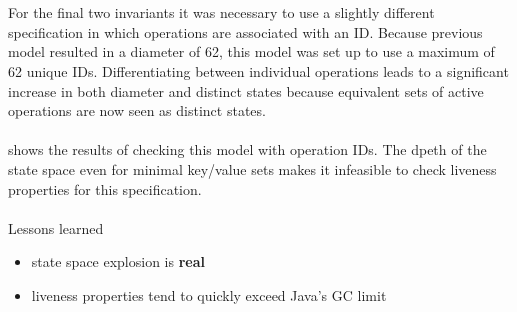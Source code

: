\documentclass{uit-thesis}
\begin{document}
\\\\
For the final two invariants it was necessary to use a slightly different specification in which operations are associated with an ID. Because previous model resulted in a diameter of 62, this model was set up to use a maximum of 62 unique IDs. Differentiating between individual operations leads to a significant increase in both diameter and distinct states because equivalent sets of active operations are now seen as distinct states.
\\\\
 shows the results of checking this model with operation IDs. The dpeth of the state space even for minimal key/value sets makes it infeasible to check liveness properties for this specification.
\\\\
Lessons learned
\begin{itemize}
    \item state space explosion is \textbf{real}
    \item liveness properties tend to quickly exceed Java's GC limit
\end{itemize}
\end{document}

